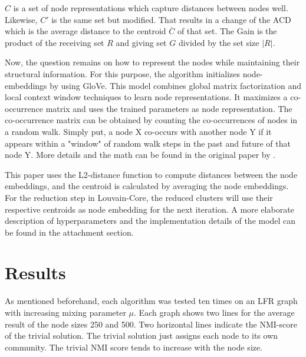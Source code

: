 \documentclass[11pt, twocolumn]{article}
\begin{document}
$C$ is a set of node representations which capture distances between nodes well. Likewise, $ C' $ is the same set but modified. That results in a change of the ACD which is the average distance to the centroid $\overline{C}$ of that set. The Gain is the product of the receiving set $R$ and giving set $G$ divided by the set size $|R|$. 

Now, the question remains on how to represent the nodes while maintaining their structural information. For this purpose, the algorithm initializes node-embeddings by using GloVe. This model combines global matrix factorization and local context window techniques to learn node representations. It maximizes a co-occurrence matrix and uses the trained parameters as node representation. The co-occurrence matrix can be obtained by counting the co-occurrences of nodes in a random walk. Simply put, a node X co-occurs with another node Y if it appears within a "window" of random walk steps in the past and future of that node Y. More details and the math can be found in the original paper by \citeauthor{pennington_GloveGlobalVectors_2014}. 

This paper uses the L2-distance function to compute distances between the node embeddings, and the centroid is calculated by averaging the node embeddings. For the reduction step in Louvain-Core, the reduced clusters will use their respective centroids as node embedding for the next iteration. A more elaborate description of hyperparameters and the implementation details of the model can be found in the attachment section. 



\section{Results}
\label{sec:results}
As mentioned beforehand, each algorithm was tested ten times on an LFR graph with increasing mixing parameter $\mu$. Each graph shows two lines for the average result of the node sizes 250 and 500. Two horizontal lines indicate the NMI-score of the trivial solution. The trivial solution just assigns each node to its own community. The trivial NMI score tends to increase with the node size.
\end{document}
